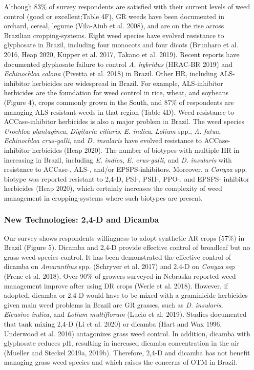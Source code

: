 \documentclass[
  12pt,
  a4paper]{article}
\begin{document}
Although 83\% of survey respondents are satisfied with their current
levels of weed control (good or excellent;Table 4F), GR weeds have been
documented in orchard, cereal, legume (Vila‐Aiub et al. 2008), and are
on the rise across Brazilian cropping-systems. Eight weed species have
evolved resistance to glyphosate in Brazil, including four monocots and
four dicots (Brunharo et al. 2016, Heap 2020, Küpper et al. 2017, Takano
et al. 2019). Recent reports have documented glyphosate failure to
control \emph{A. hybridus} (HRAC-BR 2019) and \emph{Echinochloa colona}
(Pivetta et al. 2018) in Brazil. Other HR, including ALS-inhibitor
herbicides are widespread in Brazil. For example, ALS-inhibitor
herbicides are the foundation for weed control in rice, wheat, and
soybeans (Figure 4), crops commonly grown in the South, and 87\% of
respondents are managing ALS-resistant weeds in that region (Table 4D).
Weed resistance to ACCase-inhibitor herbicides is also a major problem
in Brazil. The weed species \emph{Urochloa plantaginea}, \emph{Digitaria
ciliaris}, \emph{E. indica}, \emph{Lolium} spp., \emph{A. fatua},
\emph{Echinochloa crus-galli}, and \emph{D. insularis} have evolved
resistance to ACCase-inhibitor herbicides (Heap 2020). The number of
biotypes with multiple HR in increasing in Brazil, including \emph{E.
indica}, \emph{E. crus-galli}, and \emph{D. insularis} with resistance
to ACCase-, ALS-, and/or EPSPS-inhibitors. Moreover, a \emph{Conyza}
spp. biotype was reported resistant to 2,4-D, PSI-, PSII-, PPO-, and
EPSPS- inhibitor herbicides (Heap 2020), which certainly increases the
complexity of weed management in cropping-systems where such biotypes
are present.

\hypertarget{new-technologies-24-d-and-dicamba}{%
\subsubsection{New Technologies: 2,4-D and
Dicamba}\label{new-technologies-24-d-and-dicamba}}

Our survey shows respondents willingness to adopt synthetic AR crops
(57\%) in Brazil (Figure 5). Dicamba and 2,4-D provide effective control
of broadleaf but no grass weed species control. It has been demonstrated
the effective control of dicamba on \emph{Amaranthus} spp. (Schryver et
al. 2017) and 2,4-D on \emph{Conyza} ssp (Frene et al. 2018). Over 90\%
of growers surveyed in Nebraska reported weed management improve after
using DR crops (Werle et al. 2018). However, if adopted, dicamba or
2,4-D would have to be mixed with a graminicide herbicides given main
weed problems in Brazil are GR grasses, such as \emph{D. insularis},
\emph{Eleusine indica}, and \emph{Lolium multiflorum} (Lucio et al.
2019). Studies documented that tank mixing 2,4-D (Li et al. 2020) or
dicamba (Hart and Wax 1996, Underwood et al. 2016) antagonizes grass
weed control. In addition, dicamba with glyphosate reduces pH, resulting
in increased dicamba concentration in the air (Mueller and Steckel
2019a, 2019b). Therefore, 2,4-D and dicamba has not benefit managing
grass weed species and which raises the concerns of OTM in Brazil.
\end{document}
